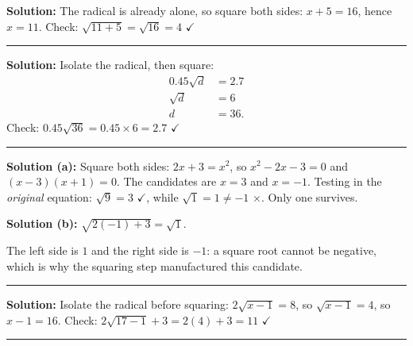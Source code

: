 \documentclass[12pt]{article}
\begin{document}



\textbf{Solution:} The radical is already alone, so square both sides:
$x + 5 = 16$, hence $x = 11$. Check: $\sqrt{11+5} = \sqrt{16} = 4$
$\checkmark$ 

\vspace{0.2cm}\noindent\rule{\linewidth}{0.2pt}\vspace{0.2cm}


\textbf{Solution:} Isolate the radical, then square:
\begin{align*}
  0.45\sqrt{d} &= 2.7 \\
  \sqrt{d} &= 6 \\
  d &= 36 .
\end{align*}
Check: $0.45\sqrt{36} = 0.45 \times 6 = 2.7$ $\checkmark$

\vspace{0.2cm}\noindent\rule{\linewidth}{0.2pt}\vspace{0.2cm}


\textbf{Solution (a):} Square both sides: $2x + 3 = x^2$, so
$x^2 - 2x - 3 = 0$ and $(x-3)(x+1) = 0$. The candidates are $x = 3$ and
$x = -1$. Testing in the \emph{original} equation: $\sqrt{9} = 3$
$\checkmark$, while $\sqrt{1} = 1 \ne -1$ $\times$. Only one survives.

\textbf{Solution (b):} $\sqrt{2(-1)+3} = \sqrt{1}$. 

The left side is $1$ and the right side is $-1$: a square root cannot be
negative, which is why the squaring step manufactured this candidate.

\vspace{0.2cm}\noindent\rule{\linewidth}{0.2pt}\vspace{0.2cm}


\textbf{Solution:} Isolate the radical before squaring:
$2\sqrt{x-1} = 8$, so $\sqrt{x-1} = 4$, so $x - 1 = 16$.
Check: $2\sqrt{17-1} + 3 = 2(4) + 3 = 11$ $\checkmark$ 

\vspace{0.2cm}\noindent\rule{\linewidth}{0.2pt}\vspace{0.2cm}
\end{document}

